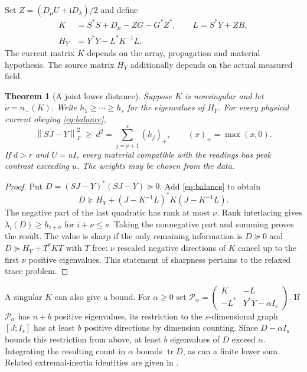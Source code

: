 \documentclass[anonymous,12pt]{iopjournal}
\newtheorem{theorem}{Theorem}[section]
\newcommand{\tr}{\operatorname{tr}}\newcommand{\diag}{\operatorname{diag}}
\newcommand{\norm}[1]{\left\|#1\right\|}\newcommand{\dd}{\mathrm d}
\numberwithin{equation}{section}
\begin{document}
Set $Z=(D_\mu U+\mathrm iD_\lambda)/2$ and define
\begin{align}
 K&=S^*S+D_\mu-ZG-G^*Z^*,\qquad L=S^*Y+ZB,\nonumber\\
 H_Y&=Y^*Y-L^*K^{-1}L .\label{eq:operators}
\end{align}
The current matrix $K$ depends on the array, propagation and material hypothesis. The source matrix $H_Y$ additionally depends on the actual measured field.

\begin{theorem}[A joint lower distance]\label{th:bound}
Suppose $K$ is nonsingular and let $\nu=n_-(K)$. Write $h_1\ge\cdots\ge h_s$ for the eigenvalues of $H_Y$. For every physical current obeying \eqref{eq:balance},
\begin{equation}
 \norm{SJ-Y}_F^2\ \ge\ d^2=\sum_{j=\nu+1}^s(h_j)_+,\qquad
 (x)_+=\max(x,0).\label{eq:bound}
\end{equation}
If $d>r$ and $U=uI$, every material compatible with the readings has peak contrast exceeding $u$. The weights may be chosen from the data.
\end{theorem}
\begin{proof}
Put $D=(SJ-Y)^*(SJ-Y)\succeq0$. Add \eqref{eq:balance} to obtain
\begin{equation}
 D\succeq H_Y+(J-K^{-1}L)^*K(J-K^{-1}L).\label{eq:completion}
\end{equation}
The negative part of the last quadratic has rank at most $\nu$. Rank interlacing gives $\lambda_i(D)\ge h_{i+\nu}$ for $i+\nu\le s$. Taking the nonnegative part and summing proves the result. The value is sharp if the only remaining information is $D\succeq0$ and $D\succeq H_Y+T^*KT$ with $T$ free: $\nu$ rescaled negative directions of $K$ cancel up to the first $\nu$ positive eigenvalues. This statement of sharpness pertains to the relaxed trace problem.
\end{proof}

A singular $K$ can also give a bound. For $\alpha\ge0$ set
$\mathcal P_\alpha=\left(\begin{smallmatrix}K&-L\\-L^*&Y^*Y-\alpha I_s\end{smallmatrix}\right)$.
If $\mathcal P_\alpha$ has $n+b$ positive eigenvalues, its restriction to the $s$-dimensional graph $[J;I_s]$ has at least $b$ positive directions by dimension counting. Since $D-\alpha I_s$ bounds this restriction from above, at least $b$ eigenvalues of $D$ exceed $\alpha$. Integrating the resulting count in $\alpha$ bounds $\tr D$, as can a finite lower sum. Related extremal-inertia identities are given in \cite{tian}.
\end{document}
